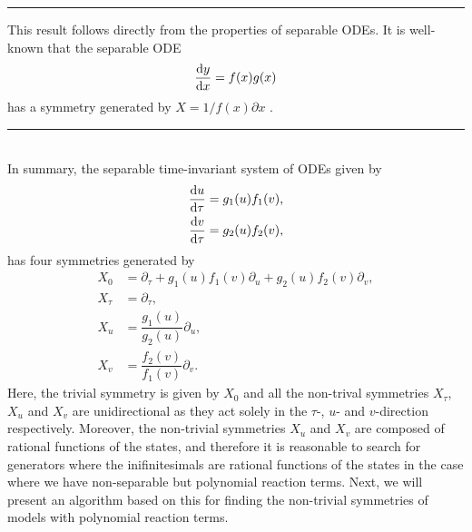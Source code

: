 \hrule
\begin{remark}
  This result follows directly from the properties of separable ODEs. It is well-known that the separable ODE
  $$\dv{y}{x}=f(x)g(x)$$
  has a symmetry generated by $X=1/f(x)\partial x$ \cite{stephani1989differential}.
  \end{remark}
\hrule
$\:$\\[0.1cm]\\
\noindent In summary, the separable time-invariant system of ODEs given by
\begin{equation}
  \begin{split}
    \dv{u}{\tau}&=g_1(u)f_1(v),\\
    \dv{v}{\tau}&=g_2(u)f_2(v),\\
  \end{split}
  \label{eq:sys_separable}
  \end{equation}
  has four symmetries generated by
    \begin{align}
      X_0&=\partial_\tau+g_1(u)f_1(v)\partial_u+g_2(u)f_2(v)\partial_v,\label{eq:gen_0}\\
      X_\tau&=\partial_\tau,\label{eq:gen_tau}\\
      X_u&=\dfrac{g_1(u)}{g_2(u)}\partial_u,\label{eq:gen_u}\\
      X_v&=\dfrac{f_2(v)}{f_1(v)}\partial_v.\label{eq:gen_v}
     \end{align}
     Here, the trivial symmetry is given by $X_0$ and all the non-trival symmetries $X_\tau$, $X_u$ and $X_v$ are unidirectional as they act solely in the $\tau$-, $u$- and $v$-direction respectively. Moreover, the non-trivial symmetries $X_u$ and $X_v$ are composed of rational functions of the states, and therefore it is reasonable to search for generators where the inifinitesimals are rational functions of the states in the case where we have non-separable but polynomial reaction terms. Next, we will present an algorithm based on this for finding the non-trivial symmetries of models with polynomial reaction terms.

